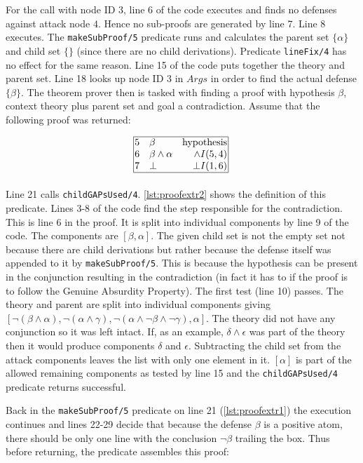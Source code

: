 \documentclass[11pt,twoside,a4paper]{report}
\begin{document}
For the call with node ID $3$, line 6 of the code executes and finds no defenses against attack node $4$. Hence no sub-proofs are generated by line 7. Line 8 executes. The \lstinline$makeSubProof/5$ predicate runs and calculates the parent set $\{\alpha\}$ and child set $\{\}$ (since there are no child derivations). Predicate \lstinline$lineFix/4$ has no effect for the same reason. Line 15 of the code puts together the theory and parent set. Line 18 looks up node ID $3$ in $Args$ in order to find the actual defense $\{\beta\}$. The theorem prover then is tasked with finding a proof with hypothesis $\beta$, context theory plus parent set and goal a contradiction. Assume that the following proof was returned:

\[\vbox{\offinterlineskip\halign{
&\tabskip=1.5em#\strut&$#$\hfil\tabskip=1em&\hfil$#$\tabskip=0em\cr
%
\multispan3\vbox{\halign{
\vrule#&&\hskip.1em\tabskip=1em#\strut&$#$\hfil\tabskip=1em&\hfil$#$\hskip0.1em\tabskip=0em&\vrule#\cr
\noalign{\hrule}
%
&5&\beta&\mbox{hypothesis}&\cr
&6&\beta\wedge\alpha&\wedge I(5,4)&\cr
&7&\bot&\bot I(1,6)&\cr
%
\noalign{\hrule}}}\,\cr
}}\]

Line 21 calls \lstinline$childGAPsUsed/4$. \autoref{lst:proofextr2} shows the definition of this predicate. Lines 3-8 of the code find the step responsible for the contradiction. This is line 6 in the proof. It is split into individual components by line 9 of the code. The components are $[\beta, \alpha]$. The given child set is not the empty set not because there are child derivations but rather because the defense itself was appended to it by \lstinline$makeSubProof/5$. This is because the hypothesis can be present in the conjunction resulting in the contradiction (in fact it has to if the proof is to follow the Genuine Absurdity Property). The first test (line 10) passes. The theory and parent are split into individual components giving $[\neg(\beta\wedge\alpha), \neg(\alpha\wedge\gamma), \neg(\alpha\wedge\neg\beta\wedge\neg\gamma), \alpha]$. The theory did not have any conjunction so it was left intact. If, as an example, $\delta\wedge\epsilon$ was part of the theory then it would produce components $\delta$ and $\epsilon$. Subtracting the child set from the attack components leaves the list with only one element in it. $[\alpha]$ is part of the allowed remaining components as tested by line 15 and the \lstinline$childGAPsUsed/4$ predicate returns successful.

Back in the \lstinline$makeSubProof/5$ predicate on line 21 (\autoref{lst:proofextr1}) the execution continues and lines 22-29 decide that because the defense $\beta$ is a positive atom, there should be only one line with the conclusion $\neg\beta$ trailing the box. Thus before returning, the predicate assembles this proof:
\end{document}
